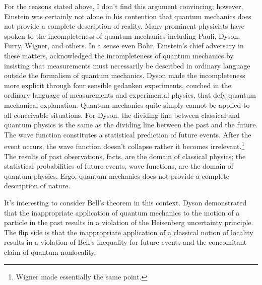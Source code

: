 \documentclass[12pt]{article}
\begin{document}
For the reasons stated above, I don't find this argument convincing; however, Einstein was certainly not alone in his contention that quantum mechanics does not provide a complete description of reality.  Many prominent physicists have spoken to the incompleteness of quantum mechanics including Pauli, Dyson, Furry, Wigner, and others.  In a sense even Bohr, Einstein's chief adversary in these matters, acknowledged the incompleteness of quantum mechanics by insisting that measurements must necessarily be described in ordinary language outside the formalism of quantum mechanics.  Dyson\cite{Dys02} made the incompleteness more explicit through four sensible gedanken experiments, couched in the ordinary language of measurements and experimental physics, that defy quantum mechanical explanation.  Quantum mechanics quite simply cannot be applied to all conceivable situations.  For Dyson, the dividing line between classical and quantum physics is the same as the dividing line between the past and the future.  The wave function constitutes a statistical prediction of future events.  After the event occurs, the wave function doesn't collapse rather it becomes irrelevant.\footnote{Wigner\cite{Wig62} made essentially the same point.}   The results of past observations, facts, are the domain of classical physics; the statistical probabilities of future events, wave functions, are the domain of quantum physics.  Ergo, quantum mechanics does not provide a complete description of nature.

It's interesting to consider Bell's theorem in this context.  Dyson demonstrated that the inappropriate application of quantum mechanics to the motion of a particle in the past results in a violation of the Heisenberg uncertainty principle.  The flip side is that the inappropriate application of a classical notion of locality results in a violation of Bell's inequality for future events and the concomitant claim of quantum nonlocality\cite{Dys16}.
\end{document}
